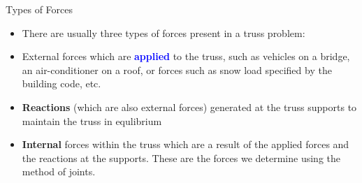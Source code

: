 \documentclass[9pt, xcolor={svgnames, x11names},professionalfonts]{beamer}
\def\scale{1}
\begin{document}
\begin{frame}{}
	\begin{myexam}{}{}
		\def\scale{0.65}
		\centering
		
	\end{myexam}
\end{frame}


\begin{frame}{Types of Forces}
	\small\centering\vspace{0.25cm}
	\def\scale{0.75}
	
	\vspace{-0.5cm}
	\begin{itemize}
		\item [] There are usually three types of forces present in a truss problem:\pause
		\item [] External forces which are \textcolor{blue}{\bfseries applied} to the truss, such as vehicles on a bridge, an air-conditioner on a roof, or forces such as snow load specified by the building code, etc.\pause
		\item [] \textcolor{saitMaroon}{\bfseries Reactions} (which are also external forces) generated at the truss supports to maintain the truss in equlibrium\pause
		\item [] \textcolor{Green4!65!black}{\bfseries Internal} forces within the truss which are a result of the applied
		      forces and the reactions at the supports. These are the forces we determine using the method of joints.
	\end{itemize}

\end{frame}

\end{document}
